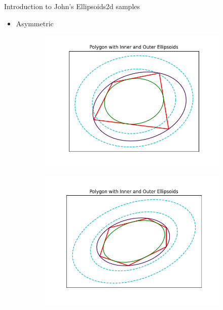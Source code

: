 \documentclass[
  english,            %
  aspectratio=169,    %
]{tumbeamer}
\begin{document}
\begin{frame}{Introduction to John's Ellipsoids}{2d samples}
  \begin{itemize}
    \item Asymmetric
  \end{itemize}
  \begin{figure}
      \centering
      \begin{subfigure}[b]{0.4\textwidth}
        \includegraphics[width=\textwidth]{plots/asym_1.png}
      \end{subfigure}
      \begin{subfigure}[b]{0.4\textwidth}
        \includegraphics[width=\textwidth]{plots/asym_2.png}
      \end{subfigure}
  \end{figure}
\end{frame}
\end{document}
